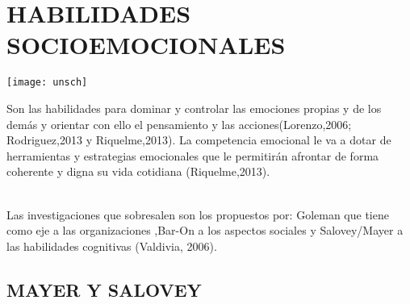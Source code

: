 
\chapter{HABILIDADES SOCIOEMOCIONALES}

\parbox{4cm}{ \texttt{[image: unsch]}} \parbox{10.8cm}{ Son las habilidades para dominar y controlar las emociones propias y de los demás y orientar con ello el pensamiento y las acciones(Lorenzo,2006; Rodriguez,2013 y Riquelme,2013). La competencia emocional le va a dotar de herramientas y estrategias emocionales que le permitirán afrontar de forma coherente y digna su vida cotidiana (Riquelme,2013).}%
\\
Las investigaciones que sobresalen son los propuestos por: Goleman que tiene como eje a las organizaciones ,Bar-On a los aspectos sociales y Salovey/Mayer a las habilidades cognitivas (Valdivia, 2006).%


\section{MAYER Y SALOVEY}

